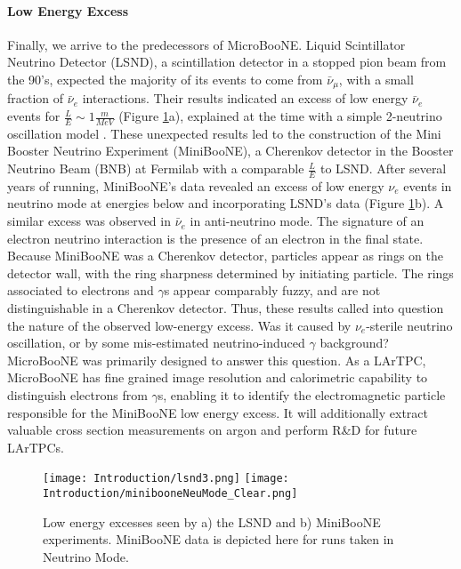 \paragraph{Low Energy Excess} %
Finally, we arrive to the predecessors of MicroBooNE. Liquid Scintillator Neutrino Detector (LSND), a scintillation detector in a stopped pion beam from the 90's, expected the majority of its events to come from $\bar{\nu}_\mu$, with a small fraction of $\bar{\nu}_e$ interactions. Their results indicated an excess of low energy $\bar{\nu}_e$ events for $\frac{L}{E} \sim 1 \frac{m}{MeV}$ (Figure \ref{fig:lsnd}a), explained at the time with a simple 2-neutrino oscillation model \cite{bib:lsnd}. These unexpected results led to the construction of the Mini Booster Neutrino Experiment (MiniBooNE), a Cherenkov detector in the Booster Neutrino Beam (BNB) at Fermilab with a comparable $\frac{L}{E}$ to LSND. After several years of running, MiniBooNE's data revealed an excess of low energy $\nu_e$ events in neutrino mode at energies below and incorporating LSND's data \cite{bib:miniboone} (Figure \ref{fig:lsnd}b). A similar excess was observed in $\bar{\nu}_e$ in anti-neutrino mode. The signature of an electron neutrino interaction is the presence of an electron in the final state. Because MiniBooNE was a Cherenkov detector, particles appear as rings on the detector wall, with the ring sharpness determined by initiating particle. The rings associated to electrons and $\gamma$s appear comparably fuzzy, and are not distinguishable in a Cherenkov detector. Thus, these results called into question the nature of the observed low-energy excess.  Was it caused by $\nu_e$-sterile neutrino oscillation, or by some mis-estimated neutrino-induced $\gamma$ background?  MicroBooNE was primarily designed to answer this question.  As a LArTPC, MicroBooNE has fine grained image resolution and calorimetric capability to distinguish electrons from $\gamma$s, enabling it to identify the electromagnetic particle responsible for the MiniBooNE low energy excess.  It will additionally extract valuable cross section measurements on argon and perform R\&D for future LArTPCs. 
\begin{figure}[H]
\centering
\texttt{[image: Introduction/lsnd3.png]}
\hspace{1.5 mm}
\texttt{[image: Introduction/minibooneNeuMode\_Clear.png]}
\caption{Low energy excesses seen by a) the LSND and b) MiniBooNE experiments.  MiniBooNE data is depicted here for runs taken in Neutrino Mode.}
\label{fig:lsnd}
\end{figure}

